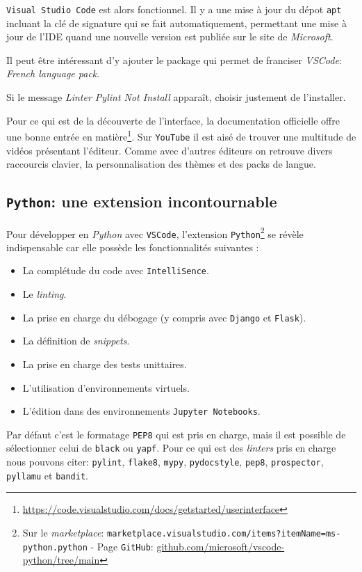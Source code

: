 \texttt{Visual Studio Code} est alors fonctionnel. Il y a une mise à jour du dépot \texttt{apt} incluant la clé de signature qui se fait automatiquement, permettant une mise à jour de l'IDE  quand une nouvelle version est publiée sur le site de \textit{Microsoft}.
\medskip

Il peut être intéressant d'y ajouter le package qui permet de franciser \textit{VSCode}: \textit{French language pack}.
\medskip

Si le message \textit{Linter Pylint Not Install} apparaît, choisir justement de l'installer.
\medskip

Pour ce qui est de la découverte de l'interface, la documentation officielle offre une bonne entrée en matière\footnote{\url{https://code.visualstudio.com/docs/getstarted/userinterface}}. Sur \texttt{YouTube} il est aisé de trouver une multitude de vidéos présentant l'éditeur. Comme avec d'autres éditeurs on retrouve divers raccourcis clavier, la personnalisation des thèmes et des packs de langue.
\medskip

\subsection*{\texttt{Python}: une extension incontournable}
Pour développer en \textit{Python} avec \texttt{VSCode}, l'extension \texttt{Python}\footnote{Sur le \textit{marketplace}: \texttt{marketplace.visualstudio.com/items?itemName=ms-python.python} - Page \texttt{GitHub}: \url{github.com/microsoft/vscode-python/tree/main}} se révèle indispensable car elle possède les fonctionnalités suivantes :
\begin{itemize}
	\item[\textbullet] La complétude du code avec \texttt{IntelliSence}.
	\item[\textbullet] Le \textit{linting}.
	\item[\textbullet] La prise en charge du débogage (y compris avec \texttt{Django} et \texttt{Flask}).
	\item[\textbullet] La définition de \textit{snippets}.
	\item[\textbullet] La prise en charge des tests unittaires.
	\item[\textbullet] L'utilisation d'environnements virtuels.
	\item[\textbullet] L'édition dans des environnements \texttt{Jupyter Notebooks}.
\end{itemize}
\medskip

Par défaut c'est le formatage \texttt{PEP8} qui est pris en charge, mais il est possible de sélectionner celui de \texttt{black} ou \texttt{yapf}. Pour ce qui est des \textit{linters} pris en charge nous pouvons citer: \texttt{pylint}, \texttt{flake8}, \texttt{mypy}, \texttt{pydocstyle}, \texttt{pep8}, \texttt{prospector}, \texttt{pyllamu} et \texttt{bandit}.
\medskip

